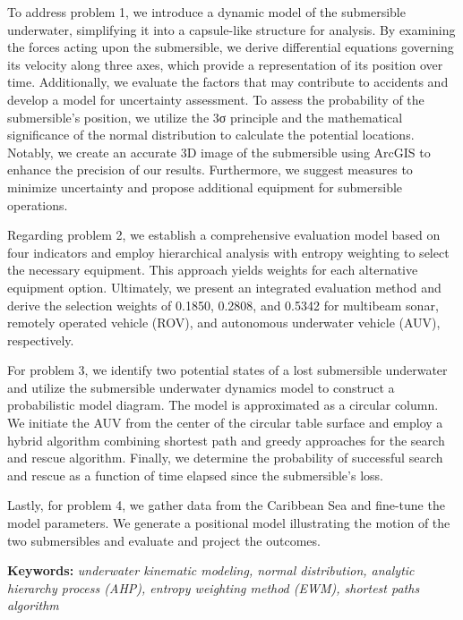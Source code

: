 \documentclass[12pt]{article}
\begin{document}
To address problem 1, we introduce a dynamic model of the submersible underwater, simplifying it into a capsule-like structure for analysis. By examining the forces acting upon the submersible, we derive differential equations governing its velocity along three axes, which provide a representation of its position over time. Additionally, we evaluate the factors that may contribute to accidents and develop a model for uncertainty assessment. To assess the probability of the submersible's position, we utilize the 3σ principle and the mathematical significance of the normal distribution to calculate the potential locations. Notably, we create an accurate 3D image of the submersible using ArcGIS to enhance the precision of our results. Furthermore, we suggest measures to minimize uncertainty and propose additional equipment for submersible operations.

Regarding problem 2, we establish a comprehensive evaluation model based on four indicators and employ hierarchical analysis with entropy weighting to select the necessary equipment. This approach yields weights for each alternative equipment option. Ultimately, we present an integrated evaluation method and derive the selection weights of 0.1850, 0.2808, and 0.5342 for multibeam sonar, remotely operated vehicle (ROV), and autonomous underwater vehicle (AUV), respectively.

For problem 3, we identify two potential states of a lost submersible underwater and utilize the submersible underwater dynamics model to construct a probabilistic model diagram. The model is approximated as a circular column. We initiate the AUV from the center of the circular table surface and employ a hybrid algorithm combining shortest path and greedy approaches for the search and rescue algorithm. Finally, we determine the probability of successful search and rescue as a function of time elapsed since the submersible's loss.

Lastly, for problem 4, we gather data from the Caribbean Sea and fine-tune the model parameters. We generate a positional model illustrating the motion of the two submersibles and evaluate and project the outcomes.

\vspace{.5cm}

\textbf{Keywords:} \textit{underwater kinematic modeling, normal distribution, analytic hierarchy process (AHP), entropy weighting method (EWM), shortest paths algorithm}


\clearpage
\pagestyle{fancy}
\end{document}
